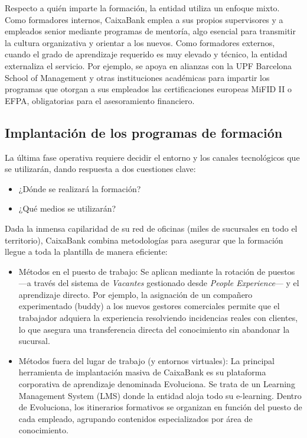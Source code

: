 Respecto a quién imparte la formación, la entidad utiliza un enfoque mixto. Como formadores internos, CaixaBank emplea a sus propios supervisores y a empleados senior mediante programas de mentoría, algo esencial para transmitir la cultura organizativa y orientar a los nuevos. Como formadores externos, cuando el grado de aprendizaje requerido es muy elevado y técnico, la entidad externaliza el servicio. Por ejemplo, se apoya en alianzas con la UPF Barcelona School of Management y otras instituciones académicas para impartir los programas que otorgan a sus empleados las certificaciones europeas MiFID II o EFPA, obligatorias para el asesoramiento financiero.

\subsection{Implantación de los programas de formación}

La última fase operativa requiere decidir el entorno y los canales tecnológicos que se utilizarán, dando respuesta a dos cuestiones clave:

\begin{itemize}
    \item ¿Dónde se realizará la formación?
    \item ¿Qué medios se utilizarán?
\end{itemize}

Dada la inmensa capilaridad de su red de oficinas (miles de sucursales en todo el territorio), CaixaBank combina metodologías para asegurar que la formación llegue a toda la plantilla de manera eficiente:

\begin{itemize}
    \item Métodos en el puesto de trabajo: Se aplican mediante la rotación de puestos —a través del sistema de \textit{Vacantes} gestionado desde \textit{People Experience}— y el aprendizaje directo. Por ejemplo, la asignación de un compañero experimentado (buddy) a los nuevos gestores comerciales permite que el trabajador adquiera la experiencia resolviendo incidencias reales con clientes, lo que asegura una transferencia directa del conocimiento sin abandonar la sucursal.
    \item Métodos fuera del lugar de trabajo (y entornos virtuales): La principal herramienta de implantación masiva de CaixaBank es su plataforma corporativa de aprendizaje denominada Evoluciona. Se trata de un Learning Management System (LMS) donde la entidad aloja todo su e-learning. Dentro de Evoluciona, los itinerarios formativos se organizan en función del puesto de cada empleado, agrupando contenidos especializados por área de conocimiento.
\end{itemize}

